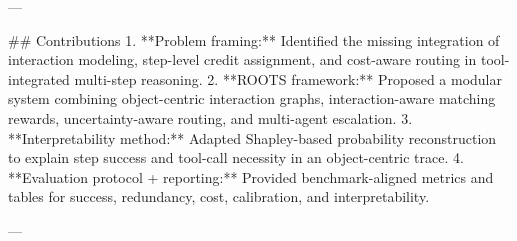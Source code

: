 ---

## Contributions
1. **Problem framing:** Identified the missing integration of interaction modeling, step-level credit assignment, and cost-aware routing in tool-integrated multi-step reasoning.
2. **ROOTS framework:** Proposed a modular system combining object-centric interaction graphs, interaction-aware matching rewards, uncertainty-aware routing, and multi-agent escalation.
3. **Interpretability method:** Adapted Shapley-based probability reconstruction to explain step success and tool-call necessity in an object-centric trace.
4. **Evaluation protocol + reporting:** Provided benchmark-aligned metrics and tables for success, redundancy, cost, calibration, and interpretability.

---